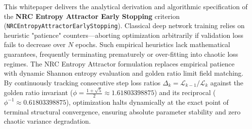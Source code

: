 \begin{abstractbox}
This whitepaper delivers the analytical derivation and algorithmic specification of the \textbf{NRC Entropy Attractor Early Stopping} criterion (\texttt{NRCEntropyAttractorEarlyStopping}). Classical deep network training relies on heuristic "patience" counters—aborting optimization arbitrarily if validation loss fails to decrease over $N$ epochs. Such empirical heuristics lack mathematical guarantees, frequently terminating prematurely or over-fitting into chaotic loss regimes. The NRC Entropy Attractor formulation replaces empirical patience with dynamic Shannon entropy evaluation and golden ratio limit field matching. By continuously tracking consecutive step loss ratios $\Delta_k = \mathcal{L}_{k-1} / \mathcal{L}_k$ against the golden ratio invariant ($\phi = \frac{1+\sqrt{5}}{2} \approx 1.61803398875$) and its reciprocal ($\phi^{-1} \approx 0.61803398875$), optimization halts dynamically at the exact point of terminal structural convergence, ensuring absolute parameter stability and zero chaotic variance degradation.
\end{abstractbox}

